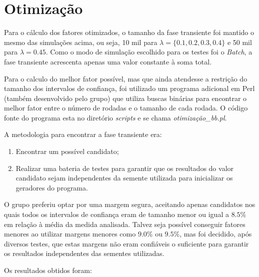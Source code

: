 \documentclass[a4paper,10pt]{article}
\begin{document}
\section{Otimização}

    Para o cálculo dos fatores otimizados, o tamanho da fase transiente foi mantido o mesmo das simulações acima, ou seja, 10 mil para $\lambda = \{0.1, 0.2, 0.3, 0.4 \}$ e 50 mil para $\lambda = 0.45$. Como o modo de simulação escolhido para os testes foi o \emph{Batch}, a fase transiente acrescenta apenas uma valor constante à soma total.

Para o calculo do melhor fator possível, mas que ainda atendesse a restrição do tamanho dos intervalos de confiança, foi utilizado um programa adicional em Perl (também desenvolvido pelo grupo) que utiliza buscas binárias para encontrar o melhor fator entre o número de rodadas e o tamanho de cada rodada. O código fonte do programa esta no diretório \emph{scripts} e se chama \emph{otimização\_bb.pl}.

A metodologia para encontrar a fase transiente era:
\begin{enumerate}
	\item Encontrar um possível candidato;
	\item Realizar uma bateria de testes para garantir que os resultados do valor candidato sejam independentes da semente utilizada para inicializar os geradores do programa.
\end{enumerate}

    O grupo preferiu optar por uma margem segura, aceitando apenas candidatos nos quais todos os intervalos de confiança eram de tamanho menor ou igual a $8.5\%$ em relação à média da medida analisada. Talvez seja possível conseguir fatores menores ao utilizar margens menores como $9.0\%$ ou $9.5\%$, mas foi decidido, após diversos testes, que estas margens não eram confiáveis o suficiente para garantir os resultados independentes das sementes utilizadas.

Os resultados obtidos foram:
\end{document}
